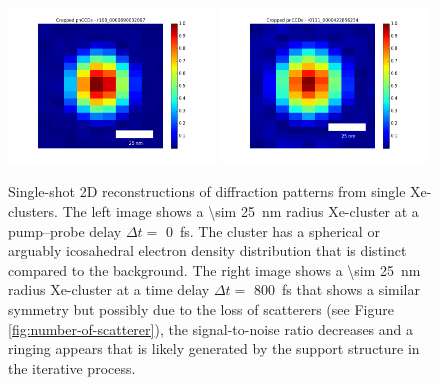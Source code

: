 %
%
%
\begin{figure}
	\centering
		\includegraphics[width=0.49\textwidth]{images/results/Xe_0_fs.png}
		\includegraphics[width=0.49\textwidth]{images/results/Xe_800_fs.png}
	\caption[Single-shot 2D reconstructions of \SI{\sim 25}{\nano\meter} radius Xe-clusters.]{Single-shot 2D reconstructions of diffraction patterns from single Xe-clusters. The left image shows a \SI{\sim 25}{\nano\meter} radius Xe-cluster at a pump--probe delay $\Delta t=$ \SI{0}{\femto\second}. The cluster has a spherical or arguably icosahedral electron density distribution that is distinct compared to the background. The right image shows a \SI{\sim 25}{\nano\meter} radius Xe-cluster at a time delay $\Delta t=$ \SI{800}{\femto\second} that shows a similar symmetry but possibly due to the loss of scatterers (see Figure \ref{fig:number-of-scatterer}), the signal-to-noise ratio decreases and a ringing appears that is likely generated by the support structure in the iterative process.}
	\label{fig:Xe-2D-reconstructions}
\end{figure}
